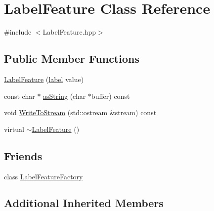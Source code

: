 \hypertarget{class_label_feature}{\section{Label\+Feature Class Reference}
\label{class_label_feature}
}


{\ttfamily \#include $<$Label\+Feature.\+hpp$>$}

\subsection*{Public Member Functions}
\begin{DoxyCompactItemize}
\item 
\hyperlink{class_label_feature_a21dbb00cb69ffea2ee565ead8801266a}{Label\+Feature} (\hyperlink{_label_feature_8hpp_a331f639078ba664b292b59c4032245e1}{label} value)
\item 
const char $\ast$ \hyperlink{class_label_feature_acad3108c7016d5d82ffea0b07ac9911e}{as\+String} (char $\ast$buffer) const 
\item 
void \hyperlink{class_label_feature_a0058053b59de5c9a9cb856ac12681296}{Write\+To\+Stream} (std\+::ostream \&stream) const 
\item 
virtual \hyperlink{class_label_feature_a5d1efc5444ce991c958943a8668f9148}{$\sim$\+Label\+Feature} ()
\end{DoxyCompactItemize}
\subsection*{Friends}
\begin{DoxyCompactItemize}
\item 
class \hyperlink{class_label_feature_a9675cfb38157a70cecfa458743f39dd1}{Label\+Feature\+Factory}
\end{DoxyCompactItemize}
\subsection*{Additional Inherited Members}


